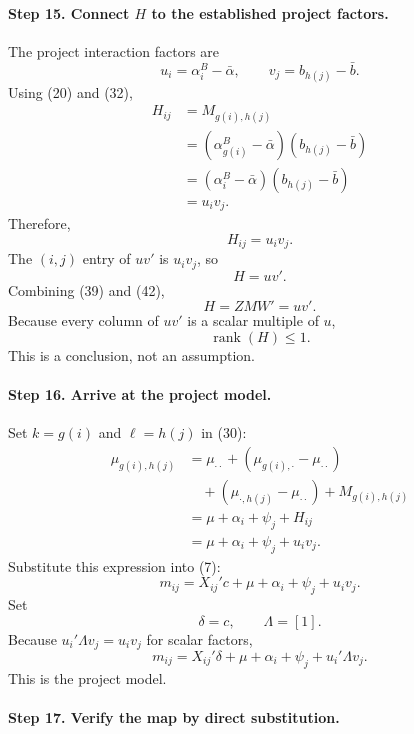 \documentclass[11pt]{article}
\newcommand{\rank}{\operatorname{rank}}
\begin{document}
\paragraph{Step 15. Connect \(H\) to the established project factors.}

The project interaction factors are
\[
u_i=\alpha_i^B-\bar\alpha,
\qquad
v_j=b_{h(j)}-\bar b.
\tag{40}
\]
Using (20) and (32),
\begin{align*}
H_{ij}
&=
M_{g(i),h(j)}\\
&=
(\alpha_{g(i)}^B-\bar\alpha)
(b_{h(j)}-\bar b)\\
&=
(\alpha_i^B-\bar\alpha)
(b_{h(j)}-\bar b)\\
&=
u_iv_j.
\end{align*}
Therefore,
\[
H_{ij}=u_iv_j.
\tag{41}
\]
The \((i,j)\) entry of \(uv'\) is \(u_iv_j\), so
\[
H=uv'.
\tag{42}
\]
Combining (39) and (42),
\[
H=ZMW'=uv'.
\tag{43}
\]
Because every column of \(uv'\) is a scalar multiple of \(u\),
\[
\rank(H)\leq1.
\tag{44}
\]
This is a conclusion, not an assumption.

\paragraph{Step 16. Arrive at the project model.}

Set \(k=g(i)\) and \(\ell=h(j)\) in (30):
\begin{align*}
\mu_{g(i),h(j)}
&=
\mu_{\cdot\cdot}
+
(\mu_{g(i),\cdot}-\mu_{\cdot\cdot})\\
&\quad+
(\mu_{\cdot,h(j)}-\mu_{\cdot\cdot})
+
M_{g(i),h(j)}\\
&=
\mu+\alpha_i+\psi_j+H_{ij}\\
&=
\mu+\alpha_i+\psi_j+u_iv_j.
\end{align*}
Substitute this expression into (7):
\[
m_{ij}
=
X_{ij}'c+\mu+\alpha_i+\psi_j+u_iv_j.
\tag{45}
\]
Set
\[
\delta=c,
\qquad
\Lambda=[1].
\tag{46}
\]
Because \(u_i'\Lambda v_j=u_iv_j\) for scalar factors,
\[
m_{ij}
=
X_{ij}'\delta
+
\mu
+
\alpha_i
+
\psi_j
+
u_i'\Lambda v_j.
\tag{Project}
\]
This is the project model.

\paragraph{Step 17. Verify the map by direct substitution.}
\end{document}
